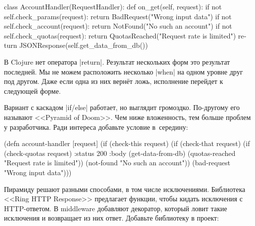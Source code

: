 \begin{english}
  \begin{python}
class AccountHandler(RequestHandler):
  def on_get(self, request):
    if not self.check_params(request):
      return BadRequest("Wrong input data")
    if not self.check_account(request):
      return NotFound("No such an account")
    if not self.check_quotas(request):
      return QuotasReached("Request rate is limited")
    return JSONResponse(self.get_data_from_db())
  \end{python}
\end{english}


В Clojure нет оператора \spverb|return|. Результат нескольких форм это результат
последней. Мы не можем расположить несколько \spverb|when| на одном уровне друг
под другом. Даже если одна из них верн\"{е}т ложь, исполнение перейдет к следующей
форме.


Вариант с каскадом \spverb|if/else| работает, но выглядит громоздко. По-другому
его называют <<Pyramid of Doom>>. Чем ниже вложенность, тем больше проблем у
разработчика. Ради интереса добавьте условие в~середину:

\begin{english}
  \begin{clojure}
(defn account-handler [request]
  (if (check-this request)
    (if (check-that request)
      (if (check-quotas request)
        {:status 200
         :body (get-data-from-db)}
        (quotas-reached "Request rate is limited"))
      (not-found "No such an account"))
    (bad-request "Wrong input data")))
  \end{clojure}
\end{english}


Пирамиду решают разными способами, в том числе исключениями. Библиотека <<Ring
HTTP Response>> предлагает функции, чтобы кидать исключения с HTTP-ответом. В
middleware добавляют декоратор, который ловит такие исключения и возвращает из
них ответ. Добавьте библиотеку в проект:

\begin{english}
  \begin{clojure}
  \end{clojure}
\end{english}

